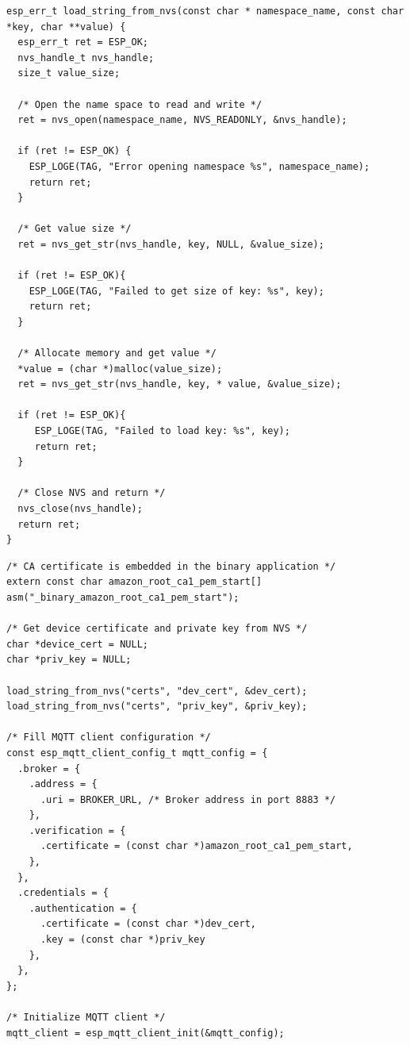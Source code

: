 \begin{lstlisting}[label=cod:mtcnn_struct,caption=Función para cargar una cadena de caracteres de la NVS.]
esp_err_t load_string_from_nvs(const char * namespace_name, const char *key, char **value) {
  esp_err_t ret = ESP_OK;
  nvs_handle_t nvs_handle;
  size_t value_size;

  /* Open the name space to read and write */
  ret = nvs_open(namespace_name, NVS_READONLY, &nvs_handle);

  if (ret != ESP_OK) {
	ESP_LOGE(TAG, "Error opening namespace %s", namespace_name);
	return ret;
  }

  /* Get value size */
  ret = nvs_get_str(nvs_handle, key, NULL, &value_size);

  if (ret != ESP_OK){
	ESP_LOGE(TAG, "Failed to get size of key: %s", key);
    return ret;
  }

  /* Allocate memory and get value */
  *value = (char *)malloc(value_size);
  ret = nvs_get_str(nvs_handle, key, * value, &value_size);

  if (ret != ESP_OK){
	 ESP_LOGE(TAG, "Failed to load key: %s", key);
     return ret;
  }

  /* Close NVS and return */
  nvs_close(nvs_handle);
  return ret;
}
\end{lstlisting}

\begin{lstlisting}[label=cod:mtcnn_struct,caption=Código para inicializar MQTT en modo cliente.]
/* CA certificate is embedded in the binary application */
extern const char amazon_root_ca1_pem_start[] asm("_binary_amazon_root_ca1_pem_start");

/* Get device certificate and private key from NVS */
char *device_cert = NULL;
char *priv_key = NULL;

load_string_from_nvs("certs", "dev_cert", &dev_cert);
load_string_from_nvs("certs", "priv_key", &priv_key);

/* Fill MQTT client configuration */
const esp_mqtt_client_config_t mqtt_config = {
  .broker = {
    .address = {
      .uri = BROKER_URL, /* Broker address in port 8883 */
    },
	.verification = {
      .certificate = (const char *)amazon_root_ca1_pem_start,
    },
  },
  .credentials = {
    .authentication = {
      .certificate = (const char *)dev_cert,
      .key = (const char *)priv_key
    },
  },
};

/* Initialize MQTT client */
mqtt_client = esp_mqtt_client_init(&mqtt_config);
\end{lstlisting}

